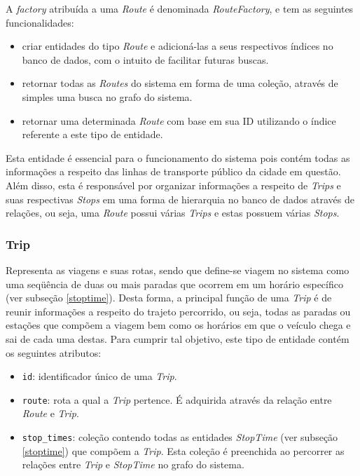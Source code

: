 A \emph{factory} atribuída a uma \emph{Route} é denominada \emph{RouteFactory}, e tem as seguintes funcionalidades:
\begin{itemize}
	\item criar entidades do tipo \emph{Route} e adicioná-las a seus respectivos índices no banco de dados, com o intuito de facilitar futuras buscas.
	\item retornar todas as \emph{Routes} do sistema em forma de uma coleção, através de simples uma busca no grafo do sistema.
	\item retornar uma determinada \emph{Route} com base em sua ID utilizando o índice referente a este tipo de entidade.
\end{itemize}

Esta entidade é essencial para o funcionamento do sistema pois contém todas as informações a respeito das linhas de transporte público da cidade em questão.
Além disso, esta é responsável por organizar informações a respeito de \emph{Trips} e suas respectivas \emph{Stops} em uma forma de hierarquia no banco de dados através de relações, ou seja, uma \emph{Route} possui várias \emph{Trips} e estas possuem várias \emph{Stops}.

\subsubsection{Trip}
\label{trip}
Representa as viagens e suas rotas, sendo que define-se viagem no sistema como uma seqüência de duas ou mais paradas que ocorrem em um horário específico (ver subseção \ref{stoptime}).
Desta forma, a principal função de uma \emph{Trip} é de reunir informações a respeito do trajeto percorrido, ou seja, todas as paradas ou estações que compõem a viagem bem como os horários em que o veículo chega e sai de cada uma destas.
Para cumprir tal objetivo, este tipo de entidade contém os seguintes atributos:

\begin{itemize}
	\item \texttt{id}: identificador único de uma \emph{Trip}.
	\item \texttt{route}: rota a qual a \emph{Trip} pertence.
	É adquirida através da relação entre \emph{Route} e \emph{Trip}.
	\item \texttt{stop\_times}: coleção contendo todas as entidades \emph{StopTime} (ver subseção \ref{stoptime}) que compõem a \emph{Trip}.
	Esta coleção é preenchida ao percorrer as relações entre \emph{Trip} e \emph{StopTime} no grafo do sistema.
\end{itemize}

